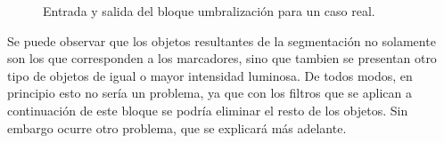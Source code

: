 \begin{figure}[H]
        \centering
        \hspace{5 mm}
  \caption{Entrada y salida del bloque umbralización para un caso real.}
      \label{ejemploabelumbr}
\end{figure}

Se puede observar que los objetos resultantes de la segmentación no solamente son los que corresponden a los marcadores, sino que tambien se presentan otro tipo de objetos de igual o mayor intensidad luminosa. De todos modos, en principio esto no sería un problema, ya que con los filtros que se aplican a continuación de este bloque se podría eliminar el resto de los objetos. Sin embargo ocurre otro problema, que se explicará más adelante.

